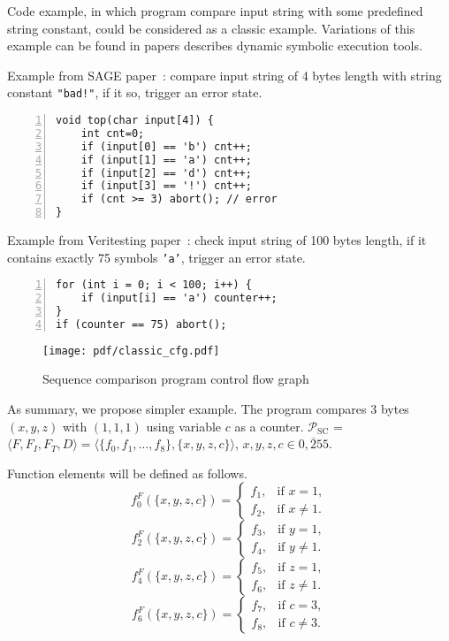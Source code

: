 \documentclass[fleqn,oneside,a4]{article}
\begin{document}
Code example, in which program compare input string with some
predefined string constant, could be considered as a classic example.
Variations of this example can be found in papers describes
dynamic symbolic execution tools.

Example from SAGE paper~\cite{sage}: compare input string of 4 bytes length
with string constant \texttt{"bad!"}, if it so, trigger an error state.
\begin{lstlisting}[numbers=left,numberstyle=\scriptsize]
void top(char input[4]) {
    int cnt=0;
    if (input[0] == 'b') cnt++;
    if (input[1] == 'a') cnt++;
    if (input[2] == 'd') cnt++;
    if (input[3] == '!') cnt++;
    if (cnt >= 3) abort(); // error
}
\end{lstlisting}

Example from Veritesting paper~\cite{veritesting}: check input string of
100 bytes length, if it contains exactly 75 symbols \texttt{'a'},
trigger an error state.
\begin{lstlisting}[numbers=left,numberstyle=\scriptsize]
for (int i = 0; i < 100; i++) {
    if (input[i] == 'a') counter++;
}
if (counter == 75) abort();
\end{lstlisting}

\begin{wrapfigure}{r}{5cm}
\begin{center}
\texttt{[image: pdf/classic\_cfg.pdf]}
\end{center}
\caption{Sequence comparison program control flow graph}
\end{wrapfigure}

As summary, we propose simpler example.
The program compares 3 bytes $(x, y, z)$ with $(1, 1, 1)$ using
variable $c$ as a counter.
$\mathcal{P}_{\text{SC}}$ = $\langle F, F_I, F_T, D \rangle =
    \langle \{f_0, f_1, \dots, f_8\},
    \{x, y, z, c\} \rangle$,
$x, y, z, c \in \overline{0, 255}$.

Function elements will be defined as follows.
\[ f_0^F(\{x, y, z, c\}) =
    \begin{cases}
        f_1, & \text{if }x = 1, \\
        f_2, & \text{if }x \neq 1.
    \end{cases} \]
\[ f_2^F(\{x, y, z, c\}) =
    \begin{cases}
        f_3, & \text{if }y = 1, \\
        f_4, & \text{if }y \neq 1.
    \end{cases} \]
\[ f_4^F(\{x, y, z, c\}) =
    \begin{cases}
        f_5, & \text{if }z = 1, \\
        f_6, & \text{if }z \neq 1.
    \end{cases} \]
\[ f_6^F(\{x, y, z, c\}) =
    \begin{cases}
        f_7, & \text{if }c = 3, \\
        f_8, & \text{if }c \neq 3.
    \end{cases} \]
\end{document}
